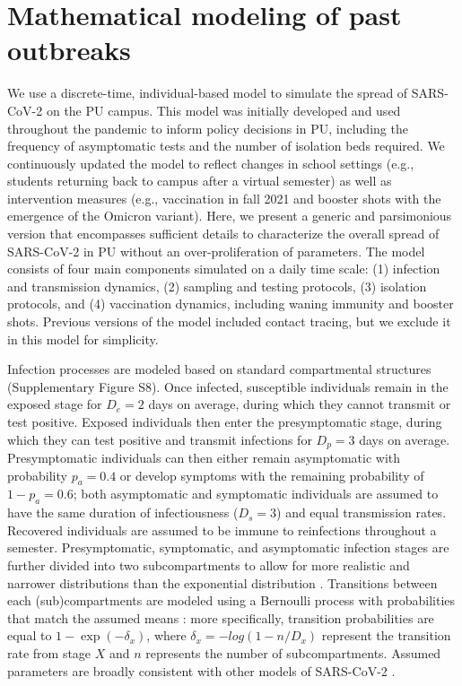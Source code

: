 \documentclass[12pt]{article}
\begin{document}
\section*{Mathematical modeling of past outbreaks}

We use a discrete-time, individual-based model to simulate the spread of SARS-CoV-2 on the PU campus.
This model was initially developed and used throughout the pandemic to inform policy decisions in PU, including the frequency of asymptomatic tests and the number of isolation beds required.
We continuously updated the model to reflect changes in school settings (e.g., students returning back to campus after a virtual semester) as well as intervention measures (e.g., vaccination in fall 2021 and booster shots with the emergence of the Omicron variant).
Here, we present a generic and parsimonious version that encompasses sufficient details to characterize the overall spread of SARS-CoV-2 in PU without an over-proliferation of parameters.
The model consists of four main components simulated on a daily time scale: (1) infection and transmission dynamics, (2) sampling and testing protocols, (3) isolation protocols, and (4) vaccination dynamics, including waning immunity and booster shots.
Previous versions of the model included contact tracing, but we exclude it in this model for simplicity.

Infection processes are modeled based on standard compartmental structures (Supplementary Figure S8).
Once infected, susceptible individuals remain in the exposed stage for $D_e = 2$ days on average, during which they cannot transmit or test positive. 
Exposed individuals then enter the presymptomatic stage, during which they can test positive and transmit infections for $D_p = 3$ days on average.
Presymptomatic individuals can then either remain asymptomatic with probability $p_a = 0.4$ or develop symptoms with the remaining probability of $1-p_a = 0.6$; both asymptomatic and symptomatic individuals are assumed to have the same duration of infectiousness ($D_s=3$) and equal transmission rates.
Recovered individuals are assumed to be immune to reinfections throughout a semester.
Presymptomatic, symptomatic, and asymptomatic infection stages are further divided into two subcompartments to allow for more realistic and narrower distributions than the exponential distribution \citep{brett2020transmission}.
Transitions between each (sub)compartments are modeled using a Bernoulli process with probabilities that match the assumed means \citep{he2010plug}:
more specifically, transition probabilities are equal to $1 - \exp(-\delta_x)$, where $\delta_x = -log(1-n/D_x)$ represent the transition rate from stage $X$ and $n$ represents the number of subcompartments.
Assumed parameters are broadly consistent with other models of SARS-CoV-2 \citep{brett2020transmission,lavezzo2020suppression}.
\end{document}
